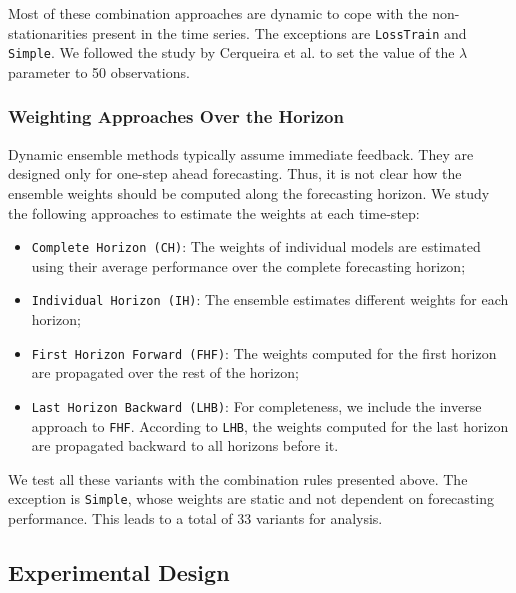 \documentclass[smallcondensed]{svjour3}
\begin{document}
Most of these combination approaches are dynamic to cope with the non-stationarities present in the time series. The exceptions are \texttt{LossTrain} and  \texttt{Simple}.
We followed the study by Cerqueira et al. \cite{cerqueira2019arbitrage} to set the value of the $\lambda$ parameter to 50 observations.

\subsubsection{Weighting Approaches Over the Horizon}\label{sec:weightfuncs}

Dynamic ensemble methods typically assume immediate feedback. They are designed only for one-step ahead forecasting.
Thus, it is not clear how the ensemble weights should be computed along the forecasting horizon.
We study the following approaches to estimate the weights at each time-step:

\begin{itemize}

\item \texttt{Complete Horizon (CH)}: The weights of individual models are estimated using their average performance over the complete forecasting horizon;

\item \texttt{Individual Horizon (IH)}: The ensemble estimates different weights for each horizon;

\item \texttt{First Horizon Forward (FHF)}: The weights computed for the first horizon are propagated over the rest of the horizon;

\item \texttt{Last Horizon Backward (LHB)}: For completeness, we include the inverse approach to \texttt{FHF}. According to \texttt{LHB}, the weights computed for the last horizon are propagated backward to all horizons before it.

\end{itemize}

We test all these variants with the combination rules presented above. The exception is \texttt{Simple}, whose weights are static and not dependent on forecasting performance. This leads to a total of 33 variants for analysis.

\subsection{Experimental Design}\label{ssec:ed}
\end{document}
